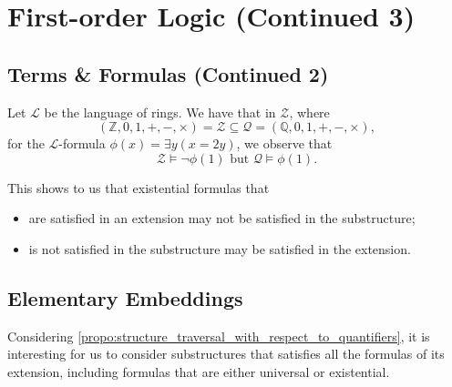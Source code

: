 \documentclass[notoc,notitlepage]{tufte-book}
\begin{document}
\section{First-order Logic (Continued 3)}%
\label{sec:first_order_logic_continued_3}

\subsection{Terms \& Formulas (Continued 2)}%
\label{sub:terms_n_formulas_continued_2}

\begin{eg}
  Let $\mathcal{L}$ be the language of rings. We have that in $\mathcal{Z}$, where
  \begin{equation*}
    (\mathbb{Z}, 0, 1, +, -, \times) = \mathcal{Z} \subseteq \mathcal{Q} = (\mathbb{Q}, 0, 1, +, -, \times),
  \end{equation*}
  for the $\mathcal{L}$-formula $\phi(x) = \exists y (x = 2y)$, we observe that
  \begin{equation*}
    \mathcal{Z} \models \neg \phi(1) \text{ but } \mathcal{Q} \models \phi(1).
  \end{equation*}
\end{eg}

This shows to us that existential formulas that 
\begin{itemize}
  \item are satisfied in an extension may not be satisfied in the substructure;
  \item is not satisfied in the substructure may be satisfied in the extension.
\end{itemize}


\subsection{Elementary Embeddings}%
\label{sub:elementary_embeddings}

Considering \cref{propo:structure_traversal_with_respect_to_quantifiers}, it is interesting for us to consider substructures that satisfies all the formulas of its extension, including formulas that are either universal or existential.
\end{document}
